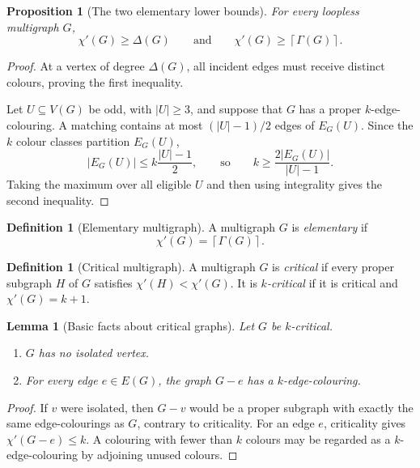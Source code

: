 \documentclass[11pt]{article}
\newtheorem{lemma}[theorem]{Lemma}
\newtheorem{proposition}[theorem]{Proposition}
\theoremstyle{definition}
\newtheorem{definition}[theorem]{Definition}
\newcommand{\abs}[1]{\lvert #1\rvert}
\newcommand{\ceil}[1]{\left\lceil #1\right\rceil}
\begin{document}
\begin{proposition}[The two elementary lower bounds]\label{prop:lower-bounds}
For every loopless multigraph $G$,
\[
  \chi'(G)\ge \Delta(G)
  \qquad\text{and}\qquad
  \chi'(G)\ge \ceil{\Gamma(G)}.
\]
\end{proposition}

\begin{proof}
At a vertex of degree $\Delta(G)$, all incident edges must receive distinct
colours, proving the first inequality.

Let $U\subseteq V(G)$ be odd, with $\abs U\ge3$, and suppose that $G$ has a
proper $k$-edge-colouring.  A matching contains at most
$(\abs U-1)/2$ edges of $E_G(U)$.  Since the $k$ colour classes partition
$E_G(U)$,
\[
  \abs{E_G(U)}\le k\frac{\abs U-1}{2},
  \qquad\text{so}\qquad
  k\ge \frac{2\abs{E_G(U)}}{\abs U-1}.
\]
Taking the maximum over all eligible $U$ and then using integrality gives the
second inequality.
\end{proof}

\begin{definition}[Elementary multigraph]
A multigraph $G$ is \emph{elementary} if
\[
  \chi'(G)=\ceil{\Gamma(G)}.
\]
\end{definition}

\begin{definition}[Critical multigraph]
A multigraph $G$ is \emph{critical} if every proper subgraph $H$ of $G$ satisfies
$\chi'(H)<\chi'(G)$.  It is \emph{$k$-critical} if it is critical and
$\chi'(G)=k+1$.
\end{definition}

\begin{lemma}[Basic facts about critical graphs]\label{lem:critical-facts}
Let $G$ be $k$-critical.
\begin{enumerate}
  \item $G$ has no isolated vertex.
  \item For every edge $e\in E(G)$, the graph $G-e$ has a $k$-edge-colouring.
\end{enumerate}
\end{lemma}

\begin{proof}
If $v$ were isolated, then $G-v$ would be a proper subgraph with exactly the
same edge-colourings as $G$, contrary to criticality.  For an edge $e$,
criticality gives $\chi'(G-e)\le k$.  A colouring with fewer than $k$ colours
may be regarded as a $k$-edge-colouring by adjoining unused colours.
\end{proof}
\end{document}
